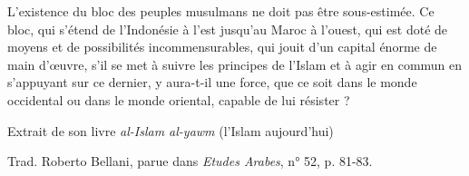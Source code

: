 L'existence du bloc des peuples musulmans ne doit pas être sous-estimée.
Ce bloc, qui s'étend de l'Indonésie à l'est jusqu'au Maroc à l'ouest,
qui est doté de moyens et de possibilités incommensurables, qui jouit
d'un capital énorme de main d'œuvre, s'il se met à suivre les principes
de l'Islam et à agir en commun en s'appuyant sur ce dernier, y aura-t-il
une force, que ce soit dans le monde occidental ou dans le monde
oriental, capable de lui résister ?

Extrait de son livre \emph{al-Islam al-yawm} (l'Islam aujourd'hui)

Trad. Roberto Bellani, parue dans \emph{Etudes Arabes}, n° 52, p. 81-83.
